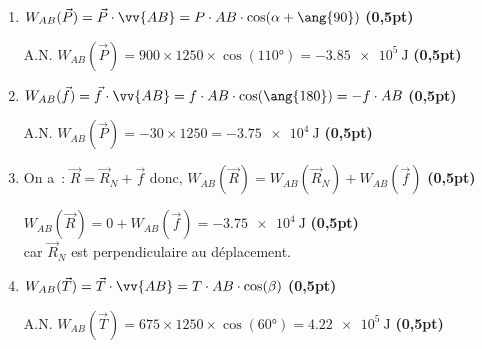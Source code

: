 \begin{enumerate}
\begin{center}
\begin{tikzpicture}
          \end{tikzpicture}
          \end{center}
    \item $W_{AB}(\vec{P})=\vec{P}\cdot \vv{AB}=
          P\cdot AB\cdot\cos(\alpha+\ang{90})$
          \hfill\textbf{(0,5pt)}

          A.N.
          $W_{AB}(\vec{P})=900\times 1250\times\cos(\ang{110})=
          \qty{-3.85e5}{\J}$
          \hfill\textbf{(0,5pt)}
    \item $W_{AB}(\vec{f})=\vec{f}\cdot \vv{AB}=
          f\cdot AB\cdot\cos(\ang{180})=-f\cdot AB$
          \hfill\textbf{(0,5pt)}

          A.N.
          $W_{AB}(\vec{P})=-30\times 1250=\qty{-3.75e4}{\J}$
          \hfill\textbf{(0,5pt)}
    \item On a~: $\vec{R}=\vec{R}_{N}+\vec{f}$ donc, 
          $W_{AB}(\vec{R})=W_{AB}(\vec{R}_{N})+W_{AB}(\vec{f})$
          \hfill\textbf{(0,5pt)}
          
          $W_{AB}(\vec{R})=0+W_{AB}(\vec{f})=\qty{-3.75e4}{\J}$
          \hfill\textbf{(0,5pt)} \\
          car $\vec{R}_{N}$ est perpendiculaire au déplacement.
    \item $W_{AB}(\vec{T})=\vec{T}\cdot \vv{AB}=
          T\cdot AB\cdot\cos(\beta)$
          \hfill\textbf{(0,5pt)}

          A.N.
          $W_{AB}(\vec{T})=675\times 1250\times\cos(\ang{60})=
          \qty{4.22e5}{\J}$
          \hfill\textbf{(0,5pt)}
\end{enumerate}

